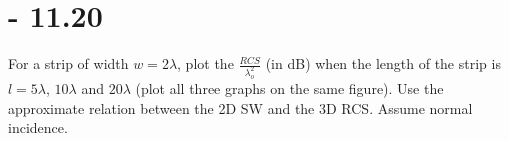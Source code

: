 \documentclass[12pt]{article}
\begin{document}
\newpage
\section{- 11.20}
For a strip of width $w = 2\lambda$, plot the $\frac{RCS}{\lambda_o^2}$ (in dB) when the length of the strip is $l = 5\lambda$, $10\lambda$ and $20\lambda$ (plot all three graphs on the same figure). Use the approximate relation between the 2D SW and the 3D RCS. Assume normal incidence.

\newpage



\end{document}
